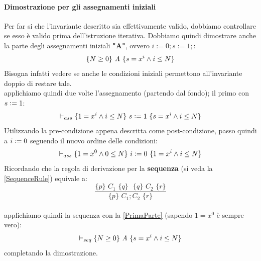 \begin{esempio}
				      				\paragraph{Dimostrazione per gli assegnamenti iniziali}
				      				Per far si che l'invariante descritto sia effettivamente valido, dobbiamo controllare se esso è valido prima dell'istruzione iterativa.
				      				Dobbiamo quindi dimostrare anche la parte degli assegnamenti iniziali \textbf{"A"}, ovvero $i := 0; s := 1;$:
				      				\begin{align}
				      					\{N\geq 0\}\mbox{ \textit{A} }\{s=x^i\land i\leq N\} 
				      					\label{PrimaParte}                                   
				      				\end{align}
				      				Bisogna infatti vedere se anche le condizioni iniziali permettono
				      				all'invariante doppio di restare tale.\\
				      				applichiamo quindi due volte l'assegnamento (partendo dal fondo); il primo con
				      				$s\cceq 1$: 
				      				\[\vdash_{ass}\{1=x^i\land i\leq N\}\mbox{ $s\cceq 1$ }\{s=x^i\land i\leq N\}\]
				      				Utilizzando la pre-condizione appena descritta come post-condizione, passo quindi a $i\cceq 0$ seguendo il nuovo ordine delle condizioni:
				      				\[\vdash_{ass}\{1=x^0\land 0\leq N\}\mbox{ $i\cceq 0$ }\{1=x^i\land i\leq N\}\]
				      				Ricordando che la regola di derivazione per la \textbf{sequenza} (si veda la \ref{SequenceRule}) equivale a:   \[\frac{\{p\}\,\, C_1\,\,\{q\}\,\,
				      					\,\,\{q\}\,\, C_2\,\,\{r\}}{\{p\}\,\, C_1;C_2\,\,\{r\}}\] \\applichiamo quindi la sequenza con la \ref{PrimaParte} (sapendo $1=x^0$ è sempre vero):
				      				\[\vdash_{seq}\{N\geq 0\}\mbox{ \textit{A} }\{s=x^i\land i\leq N\}\]
				      				completando la dimostrazione.\\
				      				\end{esempio}
